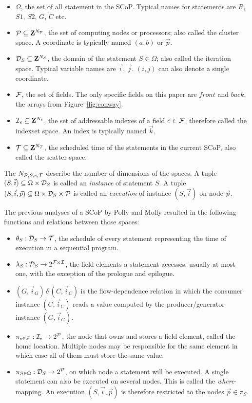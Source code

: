 \documentclass{sigplanconf}
\newcommand{\Stmt}{\Omega} \newcommand{\Field}{{\cal F}}
\newcommand{\Proc}{{\cal P}}
\newcommand{\Dom}{{\cal D}}
\newcommand{\Idx}{{\cal I}}
\newcommand{\Scat}{{\cal T}}
\begin{document}
\begin{itemize}
\item $\Stmt$, the set of all statement in the SCoP. Typical names for statements are $R$, $S1$, $S2$, $G$, $C$ etc.
\item $\Proc \subseteq \mathbf{Z}^{N_\Proc}$, the set of computing nodes or processors; also called the cluster space. A coordinate is typically named $(a,b)$ or $\vec p$.
\item $\Dom_S \subseteq \mathbf{Z}^{N_S}$, the domain of the statement $S \in \Stmt$; also called the iteration space. 
Typical variable names are $\vec i$, $\vec j$. $(i, j)$ can also denote a single coordinate.
\item $\Field$, the set of fields. The only specific fields on this paper are $front$ and $back$, the arrays from Figure~\ref{fig:conway}.
\item $\Idx_e \subseteq \mathbf{Z}^{N_e}$, the set of addressable indexes of a field $e \in \Field$, therefore called the indexset space. An index is typically named $\vec k$.
\item $\Scat \subseteq \mathbf{Z}^{N_\Scat}$, the scheduled time of the statements in the current SCoP, also called the scatter space.
\end{itemize}

The $N_{\Proc,S,e,\Scat}$ describe the number of dimensions of the spaces. A tuple $(S, \vec i) \subseteq \Stmt \times \Dom_S$ is called an \emph{instance} of statement $S$. A tuple $(S, \vec i, \vec p) \subseteq \Stmt \times \Dom_S \times \Proc$ is called an \emph{execution} of instance $(S, \vec i)$ on node $\vec p$. 

The previous analyses of a SCoP by Polly and Molly resulted in the following functions and relations between those spaces:

\begin{itemize}
\item $\theta_S: \Dom_S \rightarrow \Scat$, the schedule of every statement representing the time of execution in a sequential program.
\item $\lambda_S: \Dom_S \rightarrow 2^{\Field \times \Idx}$, the field elements a statement accesses, usually at most one, with the exception of the prologue and epilogue.
\item $(G, \vec i_G) \,\delta\, (C, \vec i_C)$ is the flow-dependence relation in which the consumer instance $(C, \vec i_C)$ reads a value computed by the producer/generator instance $(G, \vec i_G)$.

\item $\pi_{e \in \Field}: \Idx_e \rightarrow 2^\Proc$, the node that owns and stores a field element, called the home location. Multiple nodes may be responsible for the same element in which case all of them must store the same value.
\item $\pi_{S \in \Stmt}: \Dom_S \rightarrow 2^\Proc$, on which node a statement will be executed. A single statement can also be executed on several nodes. This is called the \emph{where}-mapping. An execution $(S, \vec i, \vec p)$ is therefore restricted to the nodes $\vec p \in \pi_S$.
\end{itemize}
\end{document}

